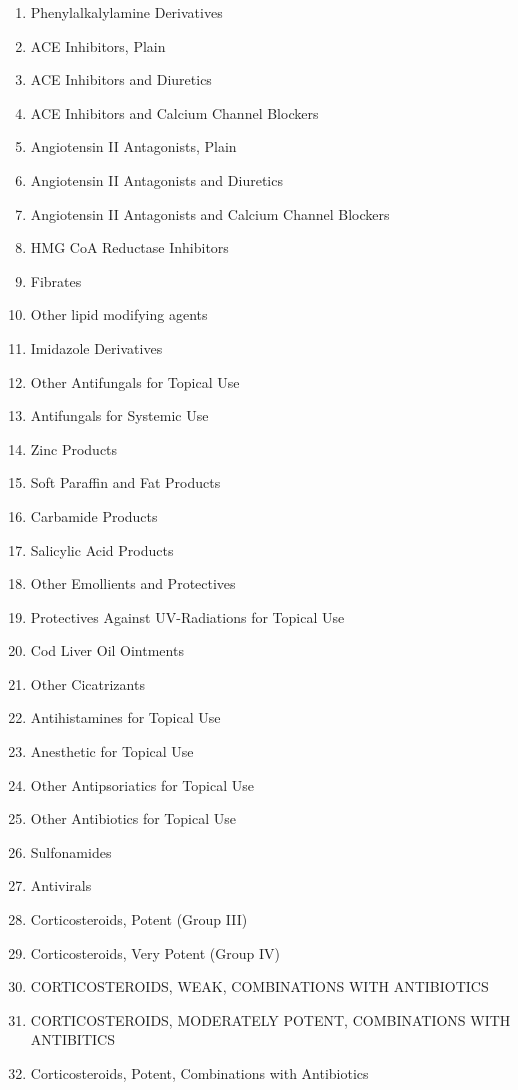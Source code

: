 \documentclass[a4paper,12pt]{article}
\begin{document}
\begin{appendices}
\begin{enumerate}
   			\item Phenylalkalylamine Derivatives
   			\item ACE Inhibitors, Plain
   			\item ACE Inhibitors and Diuretics
   			\item ACE Inhibitors and Calcium Channel Blockers
   			\item Angiotensin II Antagonists, Plain
   			\item Angiotensin II Antagonists and Diuretics
   			\item Angiotensin II Antagonists and Calcium Channel Blockers
   			\item HMG CoA Reductase Inhibitors
   			\item Fibrates
   			\item Other lipid modifying agents
   			\item Imidazole Derivatives
   			\item Other Antifungals for Topical Use
   			\item Antifungals for Systemic Use
   			\item Zinc Products
   			\item Soft Paraffin and Fat Products
   			\item Carbamide Products
   			\item Salicylic Acid Products
   			\item Other Emollients and Protectives
   			\item Protectives Against UV-Radiations for Topical Use
   			\item Cod Liver Oil Ointments
   			\item Other Cicatrizants
   			\item Antihistamines for Topical Use
   			\item Anesthetic for Topical Use
   			\item Other Antipsoriatics for Topical Use
   			\item Other Antibiotics for Topical Use
   			\item Sulfonamides
   			\item Antivirals
   			\item Corticosteroids, Potent (Group III)
   			\item Corticosteroids, Very Potent (Group IV)
   			\item CORTICOSTEROIDS, WEAK, COMBINATIONS WITH ANTIBIOTICS
   			\item CORTICOSTEROIDS, MODERATELY POTENT, COMBINATIONS WITH ANTIBITICS
   			\item Corticosteroids, Potent, Combinations with Antibiotics

\end{enumerate}
\end{appendices}
\end{document}
